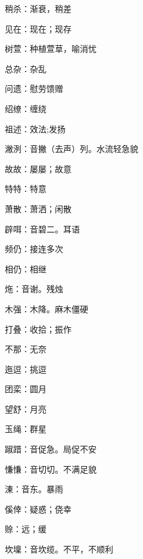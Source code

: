 稍杀：渐衰，稍差

见在：现在；现存

树萱：种植萱䓍，喻消忧

总杂：杂乱

问遗：慰劳馈赠

绍缭：缠绕

祖述：效法;发扬

潎洌：音撇（去声）列。水流轻急貌

故故：屡屡；故意

特特：特意

萧散：萧洒；闲散

辟咡：音碧二。耳语

频仍：接连多次

相仍：相继

炧：音谢。残烛

木强：木降。麻木僵硬

打叠：收拾；振作

不那：无奈

迤逗：挑逗

团栾：圆月

望舒：月亮

玉绳：群星

踧踖：音促急。局促不安

慊慊：音切切。不满足貌

涷：音东。暴雨

傒倖：疑惑；侥幸

赊：远；缓

坎壈：音坎缆。不平，不顺利

\newpage